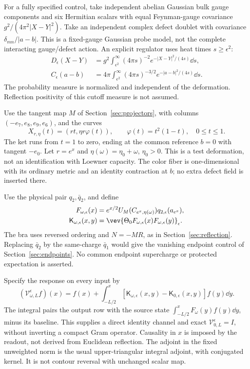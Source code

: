 For a fully specified control, take independent abelian
Gaussian bulk gauge components and six Hermitian scalars with
equal Feynman-gauge covariance
$g^2/(4\pi^2|X-Y|^2)$. Take an independent complex defect
doublet with covariance $\delta_{mn}/|a-b|$.
This is a fixed-gauge Gaussian probe model, not the complete
interacting gauge/defect action.
An explicit regulator uses heat times $s\ge\epsilon^2$:
\begin{align}
 D_\epsilon(X-Y)&=g^2\int_{\epsilon^2}^\infty
 (4\pi s)^{-2}e^{-|X-Y|^2/(4s)}\dd s,\\
 C_\epsilon(a-b)&=4\pi\int_{\epsilon^2}^\infty
 (4\pi s)^{-3/2}e^{-|a-b|^2/(4s)}\dd s.
\end{align}
The probability measure is normalized and independent of the
deformation. Reflection positivity of this cutoff measure
is not assumed.

Use the tangent map $M$ of Section~\ref{sec:projectors},
with columns $(-e_7,e_8,e_9,e_6)$, and the curves
\[
 X_{r,\eta}(t)=(rt,\eta r\varphi(t)),\qquad
 \varphi(t)=t^2(1-t),\quad 0\le t\le1.
\]
The ket runs from $t=1$ to zero, ending at the common reference
$b=0$ with tangent $-e_0$. Let $r=e^x$ and
$\eta(\omega)=\eta_0+\omega$, $\eta_0>0$.
This is a test deformation, not an identification with Loewner
capacity. The color fiber is one-dimensional with its ordinary
metric and an identity contraction at $b$; no extra defect
field is inserted there.

Use the physical pair $q_2,\bar q_2$, and define
\begin{align}
 F_{\omega,\epsilon}(x)&=
 e^{x/2}U_M(C_{e^x,\eta(\omega)})q_{2,\epsilon}(a_{e^x}),\\
 \mathsf K_{\omega,\epsilon}(x,y)&=
 \vev{\Theta_0F_{\omega,\epsilon}(x)F_{\omega,\epsilon}(y)}_\epsilon.
\end{align}
The bra uses reversed ordering and $N=-MR$, as in
Section~\ref{sec:reflection}. Replacing $\bar q_2$ by
the same-charge $\bar q_1$ would give the vanishing endpoint
control of Section~\ref{sec:endpoints}. No common endpoint
supercharge or protected expectation is asserted.

Specify the response on every input by
\begin{equation}\label{eq:retarded-readout}
 (\mathcal V^\epsilon_{\omega,L}f)(x)=f(x)+
 \int_{-L/2}^{x}
 [\mathsf K_{\omega,\epsilon}(x,y)-
  \mathsf K_{0,\epsilon}(x,y)]f(y)\dd y.
\end{equation}
The integral pairs the output row with the source state
$\int_{-L/2}^x F_\omega(y)f(y)\dd y$, minus its baseline.
This supplies a direct identity channel and exact
$\mathcal V^\epsilon_{0,L}=I$, without inverting a compact
Gram operator. Causality in $x$ is imposed by the readout,
not derived from Euclidean reflection. The adjoint in the
fixed unweighted norm is the usual upper-triangular integral
adjoint, with conjugated kernel. It is not contour reversal
with unchanged scalar map.

